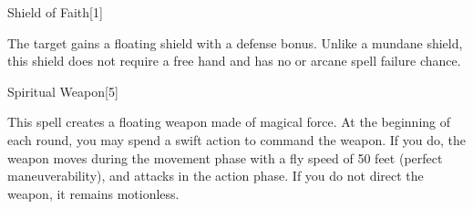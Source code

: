 \begin{spellfooter}
\begin{spellsection}{Shield of Faith}[1]
    \begin{spellheader}
    \end{spellheader}
    \begin{spellcontent}
        \begin{spelltargetinginfo}
        \end{spelltargetinginfo}
        \begin{spelleffects}
            \spelleffect The target gains a floating shield with a  defense bonus. Unlike a mundane shield, this shield does not require a free hand and has no  or arcane spell failure chance.
            \spelldur \durpersonallong
        \end{spelleffects}
    \end{spellcontent}
    \begin{spellfooter}
        \miscastexplode
    \end{spellfooter}
\end{spellsection}

\begin{spellsection}{Spiritual Weapon}[5]
    \begin{spellheader}
    \end{spellheader}
    \begin{spellcontent}
        \begin{spelltargetinginfo}
        \end{spelltargetinginfo}
        \begin{spelleffects}
            \spelleffect This spell creates a floating weapon made of magical force. At the beginning of each round, you may spend a swift action to command the weapon. If you do, the weapon moves during the movement phase with a fly speed of 50 feet (perfect maneuverability), and attacks in the action phase. If you do not direct the weapon, it remains motionless.


\end{spelleffects}
\end{spellcontent}
\end{spellsection}
\end{spellfooter}
